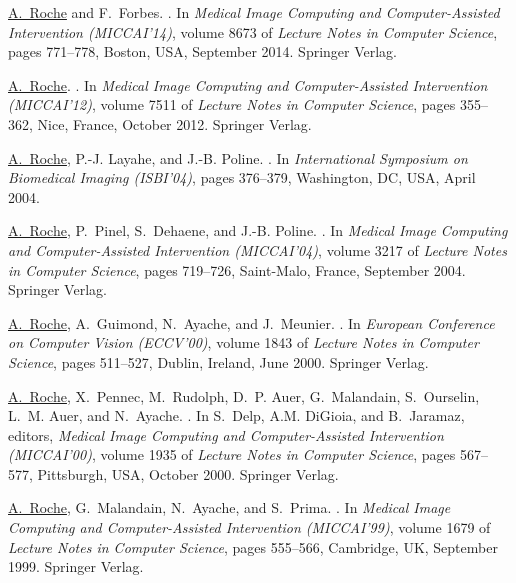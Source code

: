 \begin{thebibliography}{100}
\underline{A.~Roche} and F.~Forbes.
.
\newblock In {\em Medical Image Computing and Computer-Assisted Intervention
  (MICCAI'14)}, volume 8673 of {\em Lecture Notes in Computer Science}, pages
  771--778, Boston, USA, September 2014. Springer Verlag.

\underline{A.~Roche}.
.
\newblock In {\em Medical Image Computing and Computer-Assisted Intervention
  (MICCAI'12)}, volume 7511 of {\em Lecture Notes in Computer Science}, pages
  355--362, Nice, France, October 2012. Springer Verlag.

\underline{A.~Roche}, P.-J. Layahe, and J.-B. Poline.
.
\newblock In {\em International Symposium on Biomedical Imaging (ISBI'04)},
  pages 376--379, Washington, DC, USA, April 2004.

\underline{A.~Roche}, P.~Pinel, S.~Dehaene, and J.-B. Poline.
.
\newblock In {\em Medical Image Computing and Computer-Assisted Intervention
  (MICCAI'04)}, volume 3217 of {\em Lecture Notes in Computer Science}, pages
  719--726, Saint-Malo, France, September 2004. Springer Verlag.

\underline{A.~Roche}, A.~Guimond, N.~Ayache, and J.~Meunier.
.
\newblock In {\em European Conference on Computer Vision (ECCV'00)}, volume
  1843 of {\em Lecture Notes in Computer Science}, pages 511--527, Dublin,
  Ireland, June 2000. Springer Verlag.

\underline{A.~Roche}, X.~Pennec, M.~Rudolph, D.~P. Auer, G.~Malandain, S.~Ourselin, L.~M.
  Auer, and N.~Ayache.
.
\newblock In S.~Delp, A.M. DiGioia, and B.~Jaramaz, editors, {\em Medical Image
  Computing and Computer-Assisted Intervention (MICCAI'00)}, volume 1935 of
  {\em Lecture Notes in Computer Science}, pages 567--577, Pittsburgh, USA,
  October 2000. Springer Verlag.

\underline{A.~Roche}, G.~Malandain, N.~Ayache, and S.~Prima.
.
\newblock In {\em Medical Image Computing and Computer-Assisted Intervention
  (MICCAI'99)}, volume 1679 of {\em Lecture Notes in Computer Science}, pages
  555--566, Cambridge, UK, September 1999. Springer Verlag.


\end{thebibliography}
